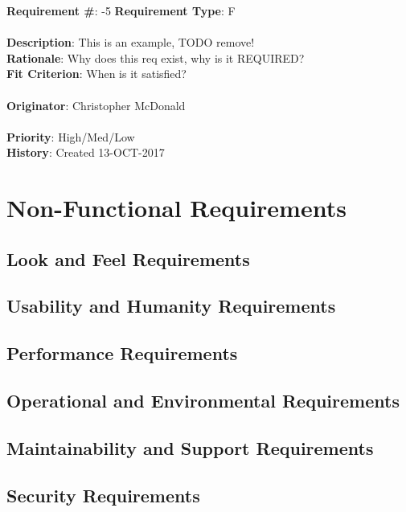 \documentclass[11pt]{article}
\begin{document}
\begin{framed}
	\noindent\textbf{Requirement \#}: -5 \hfill \textbf{Requirement Type}: F \hfill\\\\
	\noindent\textbf{Description}: This is an example, TODO remove!  \\
	\textbf{Rationale}: Why does this req exist, why is it REQUIRED? \\
	\textbf{Fit Criterion}: When is it satisfied? \\\\
	\textbf{Originator}: Christopher McDonald \\\\
	\textbf{Priority}: High/Med/Low \hfill \\
	\noindent\textbf{History}: Created 13-OCT-2017
\end{framed}


\section{Non-Functional Requirements}

\subsection{Look and Feel Requirements}

\subsection{Usability and Humanity Requirements}

\subsection{Performance Requirements}

\subsection{Operational and Environmental Requirements}

\subsection{Maintainability and Support Requirements}

\subsection{Security Requirements}
\end{document}

